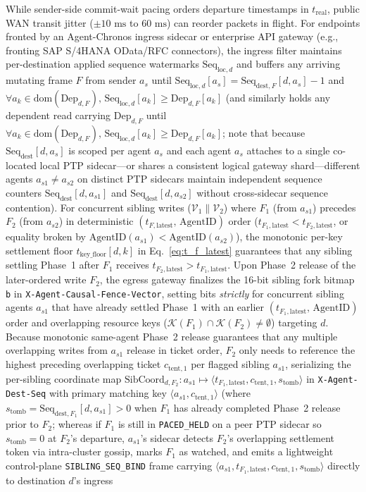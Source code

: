 \documentclass[conference,10pt]{IEEEtran}
\begin{document}
While sender-side commit-wait pacing orders departure timestamps in $t_{\text{real}}$, public WAN transit jitter ($\pm 10\text{ ms}$ to $60\text{ ms}$) can reorder packets in flight. For endpoints fronted by an Agent-Chronos ingress sidecar or enterprise API gateway (e.g., fronting SAP S/4HANA OData/RFC connectors), the ingress filter maintains per-destination applied sequence watermarks $\text{Seq}_{\text{loc},d}$ and buffers any arriving mutating frame $F$ from sender $a_s$ until $\text{Seq}_{\text{loc},d}[a_s] = \text{Seq}_{\text{dest},F}[d, a_s] - 1$ and $\forall a_k \in \text{dom}(\text{Dep}_{d,F}),\, \text{Seq}_{\text{loc},d}[a_k] \ge \text{Dep}_{d,F}[a_k]$ (and similarly holds any dependent read carrying $\text{Dep}_{d,F}$ until $\forall a_k \in \text{dom}(\text{Dep}_{d,F}),\, \text{Seq}_{\text{loc},d}[a_k] \ge \text{Dep}_{d,F}[a_k]$; note that because $\text{Seq}_{\text{dest}}[d, a_s]$ is scoped per agent $a_s$ and each agent $a_s$ attaches to a single co-located local PTP sidecar---or shares a consistent logical gateway shard---different agents $a_{s1} \ne a_{s2}$ on distinct PTP sidecars maintain independent sequence counters $\text{Seq}_{\text{dest}}[d, a_{s1}]$ and $\text{Seq}_{\text{dest}}[d, a_{s2}]$ without cross-sidecar sequence contention). For concurrent sibling writes ($\mathcal{V}_1 \parallel \mathcal{V}_2$) where $F_1$ (from $a_{s1}$) precedes $F_2$ (from $a_{s2}$) in deterministic $(t_{F,\text{latest}},\, \text{AgentID})$ order ($t_{F_1,\text{latest}} < t_{F_2,\text{latest}}$, or equality broken by $\text{AgentID}(a_{s1}) < \text{AgentID}(a_{s2})$), the monotonic per-key settlement floor $t_{\text{key\_floor}}[d, k]$ in Eq.~\eqref{eq:t_f_latest} guarantees that any sibling settling Phase~1 after $F_1$ receives $t_{F_2,\text{latest}} > t_{F_1,\text{latest}}$. Upon Phase~2 release of the later-ordered write $F_2$, the egress gateway finalizes the 16-bit sibling fork bitmap \texttt{b} in \texttt{X-Agent-Causal-Fence-Vector}, setting bits \emph{strictly} for concurrent sibling agents $a_{s1}$ that have already settled Phase~1 with an earlier $(t_{F_1,\text{latest}},\, \text{AgentID})$ order and overlapping resource keys ($\mathcal{K}(F_1) \cap \mathcal{K}(F_2) \ne \emptyset$) targeting $d$. Because monotonic same-agent Phase~2 release guarantees that any multiple overlapping writes from $a_{s1}$ release in ticket order, $F_2$ only needs to reference the highest preceding overlapping ticket $c_{\text{tent},1}$ per flagged sibling $a_{s1}$, serializing the per-sibling coordinate map $\text{SibCoord}_{d,F_2}: a_{s1} \mapsto \langle t_{F_1,\text{latest}}, c_{\text{tent},1}, s_{\text{tomb}} \rangle$ in \texttt{X-Agent-Dest-Seq} with primary matching key $\langle a_{s1}, c_{\text{tent},1} \rangle$ (where $s_{\text{tomb}} = \text{Seq}_{\text{dest},F_1}[d, a_{s1}] > 0$ when $F_1$ has already completed Phase~2 release prior to $F_2$; whereas if $F_1$ is still in \texttt{PACED\_HELD} on a peer PTP sidecar so $s_{\text{tomb}} = 0$ at $F_2$'s departure, $a_{s1}$'s sidecar detects $F_2$'s overlapping settlement token via intra-cluster gossip, marks $F_1$ as watched, and emits a lightweight control-plane \texttt{SIBLING\_SEQ\_BIND} frame carrying $\langle a_{s1}, t_{F_1,\text{latest}}, c_{\text{tent},1}, s_{\text{tomb}} \rangle$ directly to destination $d$'s ingress 
\end{document}
